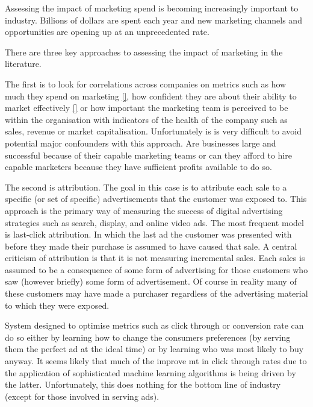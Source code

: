 Assessing the impact of marketing spend is becoming increasingly important to industry. Billions of dollars \citep{XXX} are spent each year and new marketing channels and opportunities are opening up at an unprecedented rate. 

There are three key approaches to assessing the impact of marketing in the literature. 

The first is to look for correlations across companies on metrics such as how much they spend on marketing \ref{}, how confident they are about their ability to market effectively \ref{} or how important the marketing team is perceived to be within the organisation with indicators of the health of the company such as sales, revenue or market capitalisation. Unfortunately is is very difficult to avoid potential major confounders with this approach. Are businesses large and successful because of their capable marketing teams or can they afford to hire capable marketers because they have sufficient profits available to do so. 

The second is attribution. The goal in this case is to attribute each sale to a specific (or set of specific) advertisements that the customer was exposed to. This approach is the primary way of measuring the success of digital advertising strategies such as search, display, and online video ads. The most frequent model is last-click attribution. In which the last ad the customer was presented with before they made their purchase is assumed to have caused that sale. A central criticism of attribution is that it is not measuring incremental sales. Each sales is assumed to be a consequence of some form of advertising for those customers who saw (however briefly) some form of advertisement. Of course in reality many of these customers may have made a purchaser regardless of the advertising material to which they were exposed. 

System designed to optimise metrics such as click through or conversion rate can do so either by learning how to change the consumers preferences (by serving them the perfect ad at the ideal time) or by learning who was most likely to buy anyway. It seems likely that much of the improve mt in click through rates due to the application of sophisticated machine learning algorithms is being driven by the latter. Unfortunately, this does nothing for the bottom line of industry (except for those involved in serving ads). 


